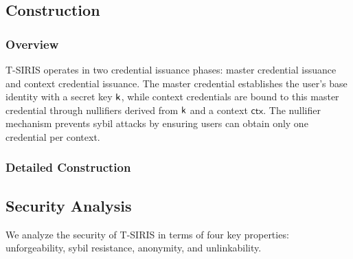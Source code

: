 \subsection{Construction}

\subsubsection{Overview}
T-SIRIS operates in two credential issuance phases: master credential issuance and context credential issuance. The master credential establishes the user's base identity with a secret key $\mathsf{k}$, while context credentials are bound to this master credential through nullifiers derived from $\mathsf{k}$ and a context $\mathsf{ctx}$. The nullifier mechanism prevents sybil attacks by ensuring users can obtain only one credential per context.

\subsubsection{Detailed Construction}

\subsection{Security Analysis}

We analyze the security of T-SIRIS in terms of four key properties: unforgeability, sybil resistance, anonymity, and unlinkability.

























\label{sec:threshold-construction}

